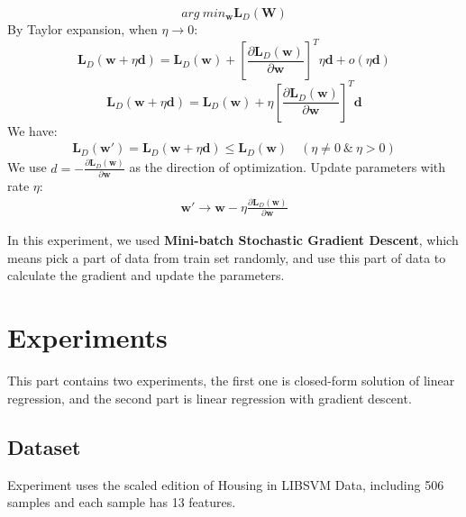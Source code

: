 \documentclass[journal, a4paper]{IEEEtran}
\begin{document}
\begin{displaymath}
arg\:min_{\boldsymbol{w}} \boldsymbol{L}_D(\boldsymbol{W})
\end{displaymath}
By Taylor expansion, when $\eta\to0$:
\begin{displaymath}
\boldsymbol{L}_D(\boldsymbol{w}+\eta\boldsymbol{d})=\boldsymbol{L}_D(\boldsymbol{w})+[\frac{\partial\boldsymbol{L}_D(\boldsymbol{w})}{\partial\boldsymbol{w}}]^T\eta\boldsymbol{d}+o(\eta\boldsymbol{d})
\end{displaymath}
\begin{displaymath}
\boldsymbol{L}_D(\boldsymbol{w}+\eta\boldsymbol{d})=\boldsymbol{L}_D(\boldsymbol{w})+\eta[\frac{\partial\boldsymbol{L}_D(\boldsymbol{w})}{\partial\boldsymbol{w}}]^T\boldsymbol{d}
\end{displaymath}
We have:
\begin{eqnarray}
\boldsymbol{L}_D(\boldsymbol{w'})=\boldsymbol{L}_D(\boldsymbol{w}+\eta\boldsymbol{d})\le\boldsymbol{L}_D(\boldsymbol{w})\quad(\eta\ne 0 \:\&\: \eta > 0)
\end{eqnarray}
We use $d=-\frac{\partial\boldsymbol{L}_D(\boldsymbol{w})}{\partial\boldsymbol{w}}$ as the direction of optimization.
Update parameters with rate $\eta$:
\begin{eqnarray}
\boldsymbol{w'}\rightarrow\boldsymbol{w}-\eta\frac{\partial\boldsymbol{L}_D(\boldsymbol{w})}{\partial\boldsymbol{w}}
\end{eqnarray}

In this experiment, we used \textbf{Mini-batch Stochastic Gradient Descent}, which means pick a part of data from train set randomly, and use this part of data to calculate the gradient and update the parameters. 

\section{Experiments}
This part contains two experiments, the first one is closed-form solution of linear regression, and the second part is linear regression with gradient descent. 
\subsection{Dataset}
Experiment uses the scaled edition of Housing in LIBSVM Data, including 506 samples and each sample has 13 features. 
\end{document}
